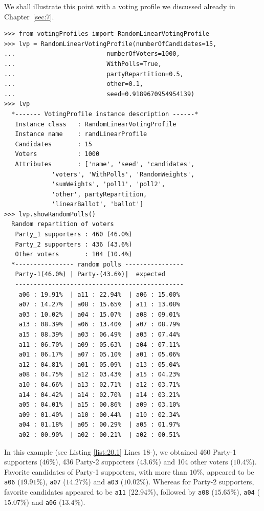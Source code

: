 We shall illustrate this point with a voting profile we discussed already in Chapter~\ref{sec:7}.
\begin{lstlisting}[caption={Example of a 3 parties voting profile},label=list:20.1]
>>> from votingProfiles import RandomLinearVotingProfile
>>> lvp = RandomLinearVotingProfile(numberOfCandidates=15,
...                         numberOfVoters=1000,
...                         WithPolls=True,
...                         partyRepartition=0.5,
...                         other=0.1,
...                         seed=0.9189670954954139)
>>> lvp
  *------- VotingProfile instance description ------*
   Instance class   : RandomLinearVotingProfile
   Instance name    : randLinearProfile
   Candidates       : 15
   Voters           : 1000
   Attributes       : ['name', 'seed', 'candidates',
             'voters', 'WithPolls', 'RandomWeights',
             'sumWeights', 'poll1', 'poll2',
             'other', partyRepartition,
             'linearBallot', 'ballot']
>>> lvp.showRandomPolls()
  Random repartition of voters
   Party_1 supporters : 460 (46.0%)
   Party_2 supporters : 436 (43.6%)
   Other voters       : 104 (10.4%)
  *---------------- random polls ----------------
   Party-1(46.0%) | Party-(43.6%)|  expected  
   ----------------------------------------------
    a06 : 19.91%  | a11 : 22.94%  | a06 : 15.00%
    a07 : 14.27%  | a08 : 15.65%  | a11 : 13.08%
    a03 : 10.02%  | a04 : 15.07%  | a08 : 09.01%
    a13 : 08.39%  | a06 : 13.40%  | a07 : 08.79%
    a15 : 08.39%  | a03 : 06.49%  | a03 : 07.44%
    a11 : 06.70%  | a09 : 05.63%  | a04 : 07.11%
    a01 : 06.17%  | a07 : 05.10%  | a01 : 05.06%
    a12 : 04.81%  | a01 : 05.09%  | a13 : 05.04%
    a08 : 04.75%  | a12 : 03.43%  | a15 : 04.23%
    a10 : 04.66%  | a13 : 02.71%  | a12 : 03.71%
    a14 : 04.42%  | a14 : 02.70%  | a14 : 03.21%
    a05 : 04.01%  | a15 : 00.86%  | a09 : 03.10%
    a09 : 01.40%  | a10 : 00.44%  | a10 : 02.34%
    a04 : 01.18%  | a05 : 00.29%  | a05 : 01.97%
    a02 : 00.90%  | a02 : 00.21%  | a02 : 00.51%
\end{lstlisting}
In this example (see Listing \ref{list:20.1} Lines 18-), we obtained 460 Party-1 supporters ($46\%$), 436 Party-2 supporters ($43.6\%$) and 104 other voters ($10.4\%$). Favorite candidates of Party-1 supporters, with more than $10\%$, appeared to be \texttt{a06} ($19.91\%$), \texttt{a07} ($14.27\%$) and \texttt{a03} ($10.02\%$). Whereas for Party-2 supporters, favorite candidates appeared to be \texttt{a11} ($22.94\%$), followed by \texttt{a08} ($15.65\%$), \texttt{a04} ($15.07\%$) and \texttt{a06} ($13.4\%$).

